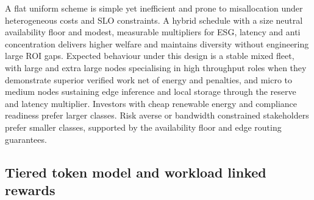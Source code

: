 \documentclass[oneside,10pt]{swissi}
\begin{document}
A flat uniform scheme is simple yet inefficient and prone to misallocation under heterogeneous costs and SLO constraints. A hybrid schedule with a size neutral availability floor and modest, measurable multipliers for ESG, latency and anti concentration delivers higher welfare and maintains diversity without engineering large ROI gaps. Expected behaviour under this design is a stable mixed fleet, with large and extra large nodes specialising in high throughput roles when they demonstrate superior verified work net of energy and penalties, and micro to medium nodes sustaining edge inference and local storage through the reserve and latency multiplier. Investors with cheap renewable energy and compliance readiness prefer larger classes. Risk averse or bandwidth constrained stakeholders prefer smaller classes, supported by the availability floor and edge routing guarantees.

\subsection{Tiered token model and workload linked rewards}
\end{document}
